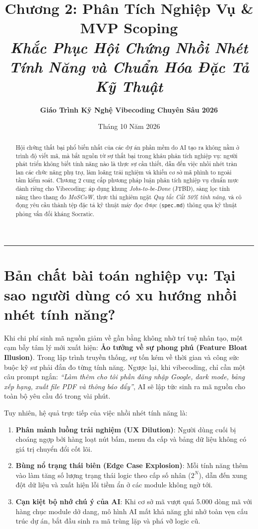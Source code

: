\documentclass[a4paper,11pt]{article}
\title{\textbf{Chương 2: Phân Tích Nghiệp Vụ \& MVP Scoping}\\[0.3em]
\large\textit{Khắc Phục Hội Chứng Nhồi Nhét Tính Năng và Chuẩn Hóa Đặc Tả Kỹ Thuật}}
\author{\textbf{Giáo Trình Kỹ Nghệ Vibecoding Chuyên Sâu 2026}}
\date{Tháng 10 Năm 2026}
\begin{document}
\maketitle

\begin{abstract}
Hội chứng thất bại phổ biến nhất của các dự án phần mềm do AI tạo ra không nằm ở trình độ viết mã, mà bắt nguồn từ sự thất bại trong khâu phân tích nghiệp vụ: người phát triển không biết tính năng nào là thực sự cần thiết, dẫn đến việc nhồi nhét tràn lan các chức năng phụ trợ, làm loãng trải nghiệm và khiến cơ sở mã phình to ngoài tầm kiểm soát. Chương 2 cung cấp phương pháp luận phân tích nghiệp vụ chuẩn mực dành riêng cho Vibecoding: áp dụng khung \textit{Jobs-to-be-Done} (JTBD), sàng lọc tính năng theo thang đo \textit{MoSCoW}, thực thi nghiêm ngặt \textit{Quy tắc Cắt 50\% tính năng}, và cô đọng yêu cầu thành tệp đặc tả kỹ thuật máy đọc được (\texttt{spec.md}) thông qua kỹ thuật phỏng vấn đối kháng Socratic.
\end{abstract}

\vspace{1em}
\rule{\textwidth}{0.4pt}

\section{Bản chất bài toán nghiệp vụ: Tại sao người dùng có xu hướng nhồi nhét tính năng?}

Khi chi phí sinh mã nguồn giảm về gần bằng không nhờ trí tuệ nhân tạo, một cạm bẫy tâm lý mới xuất hiện: \textbf{Ảo tưởng về sự phong phú (Feature Bloat Illusion)}. Trong lập trình truyền thống, sự tốn kém về thời gian và công sức buộc kỹ sư phải đắn đo từng tính năng. Ngược lại, khi vibecoding, chỉ cần một câu prompt ngắn: \textit{``Làm thêm cho tôi phần đăng nhập Google, dark mode, bảng xếp hạng, xuất file PDF và thông báo đẩy''}, AI sẽ lập tức sinh ra mã nguồn cho toàn bộ yêu cầu đó trong vài phút.

Tuy nhiên, hệ quả trực tiếp của việc nhồi nhét tính năng là:
\begin{enumerate}[label={\arabic*.}]
    \item \textbf{Phân mảnh luồng trải nghiệm (UX Dilution)}: Người dùng cuối bị choáng ngợp bởi hàng loạt nút bấm, menu đa cấp và bảng dữ liệu không có giá trị chuyển đổi cốt lõi.
    \item \textbf{Bùng nổ trạng thái biên (Edge Case Explosion)}: Mỗi tính năng thêm vào làm tăng số lượng trạng thái logic theo cấp số nhân ($2^N$), dẫn đến xung đột dữ liệu và xuất hiện lỗi tiềm ẩn ở các module không ngờ tới.
    \item \textbf{Cạn kiệt bộ nhớ chú ý của AI}: Khi cơ sở mã vượt quá 5.000 dòng mã với hàng chục module dở dang, mô hình AI mất khả năng ghi nhớ toàn vẹn cấu trúc dự án, bắt đầu sinh ra mã trùng lặp và phá vỡ logic cũ.
\end{enumerate}
\end{document}
